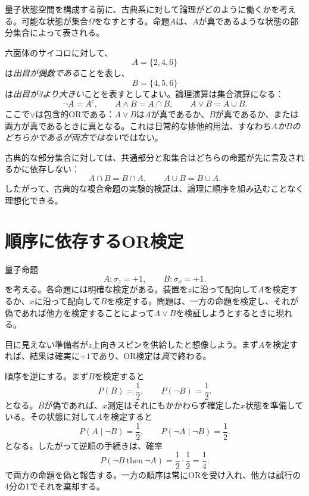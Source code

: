 量子状態空間を構成する前に、古典系に対して論理がどのように働くかを考える。可能な状態が集合\(\Omega\)をなすとする。命題\(A\)は、\(A\)が真であるような状態の部分集合によって表される。

六面体のサイコロに対して、
\[
A=\{2,4,6\}
\]
は\emph{出目が偶数である}ことを表し、
\[
B=\{4,5,6\}
\]
は\emph{出目が3より大きい}ことを表すとしてよい。論理演算は集合演算になる：
\begin{equation}
\neg A=A^c,\qquad
A\land B=A\cap B,\qquad
A\lor B=A\cup B.
\label{eq:classical-logic}
\end{equation}
ここで\(\lor\)は包含的ORである：\(A\lor B\)は\(A\)が真であるか、\(B\)が真であるか、または両方が真であるときに真となる。これは日常的な排他的用法、すなわち\emph{\(A\)か\(B\)のどちらかであるが両方ではない}ではない。

\begin{classroomqa}
\end{classroomqa}

古典的な部分集合に対しては、共通部分と和集合はどちらの命題が先に言及されるかに依存しない：
\[
A\cap B=B\cap A,\qquad A\cup B=B\cup A.
\]
したがって、古典的な複合命題の実験的検証は、論理に順序を組み込むことなく理想化できる。

\section{順序に依存するOR検定}

量子命題
\begin{equation}
A:\sigma_z=+1,\qquad B:\sigma_x=+1.
\end{equation}
を考える。各命題には明確な検定がある。装置を\(z\)に沿って配向して\(A\)を検定するか、\(x\)に沿って配向して\(B\)を検定する。問題は、一方の命題を検定し、それが偽であれば他方を検定することによって\(A\lor B\)を検証しようとするときに現れる。

目に見えない準備者が\(z\)上向きスピンを供給したと想像しよう。まず\(A\)を検定すれば、結果は確実に\(+1\)であり、OR検定は\emph{真}で終わる。

順序を逆にする。まず\(B\)を検定すると
\[
P(B)=\frac12,\qquad P(\neg B)=\frac12.
\]
となる。\(B\)が偽であれば、\(x\)測定はそれにもかかわらず確定した\(x\)状態を準備している。その状態に対して\(A\)を検定すると
\[
P(A\mid \neg B)=\frac12,\qquad
P(\neg A\mid \neg B)=\frac12.
\]
となる。したがって逆順の手続きは、確率
\begin{equation}
P(\neg B\ \text{then}\ \neg A)
=\frac12\cdot\frac12=\frac14.
\end{equation}
で両方の命題を偽と報告する。一方の順序は常にORを受け入れ、他方は試行の4分の1でそれを棄却する。

